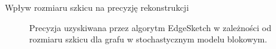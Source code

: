 \begin{frame}[squeeze]{Wpływ rozmiaru szkicu na precyzję rekonstrukcji}

    \begin{figure}[H]
        \centering
        \begin{minipage}[t]{0.8\textwidth}
            \centering
            \caption{Precyzja uzyskiwana przez algorytm EdgeSketch w zależności od rozmiaru szkicu dla grafu w stochastycznym modelu blokowym.}
        \end{minipage}
    \end{figure} 
\end{frame}